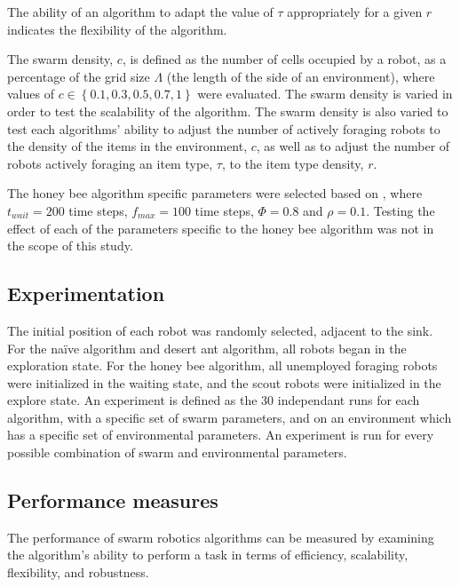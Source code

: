 \documentclass[preprint,12pt]{elsarticle}
\begin{document}
The ability of an algorithm to adapt the value of $\tau$ appropriately for a given $r$ indicates the flexibility of the algorithm.

The swarm density, $c$, is defined as the number of cells occupied by a robot, as a percentage of the grid size $\Lambda$ (the length of the side of an environment), where values of $c\in\left\{0.1, 0.3, 0.5, 0.7, 1\right\}$ were evaluated. The swarm density is varied in order to test the scalability of the algorithm. The swarm density is also varied to test each algorithms' ability to adjust the number of actively foraging robots to the density of the items in the environment, $c$, as well as to adjust the number of robots actively foraging an item type, $\tau$, to the item type density, $r$.

The honey bee algorithm specific parameters were selected based on \cite{seeley2009wisdom}, where $t_{wait}=200$ time steps, $f_{max}=100$ time steps, $\Phi=0.8$ and $\rho=0.1$. Testing the effect of each of the parameters specific to the honey bee algorithm was not in the scope of this study.

\subsection{Experimentation}
\label{experimentation}

The initial position of each robot was randomly selected, adjacent to the sink. For the na\"ive algorithm and desert ant algorithm, all robots began in the exploration state. For the honey bee algorithm, all unemployed foraging robots were initialized in the waiting state, and the scout robots were initialized in the explore state. 
An experiment is defined as the 30 independant runs for each algorithm, with a specific set of swarm parameters, and on an environment which has a specific set of environmental parameters. An experiment is run for every possible combination of swarm and environmental parameters.

\subsection{Performance measures}
\label{thri:third:performancemeasures}

The performance of swarm robotics algorithms can be measured by examining the algorithm's ability to perform a task in terms of efficiency, scalability, flexibility, and robustness.
\end{document}
